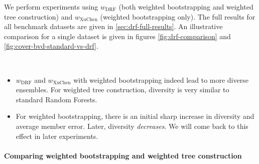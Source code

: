 \documentclass[../main.tex]{subfiles}
\begin{document}
We perform experiments using $w_\text{DRF}$ (both weighted bootstrapping and weighted tree construction) and $w_\text{XuChen}$ (weighted bootstrapping only). The full results for all benchmark datasets are given in \ref{sec:drf-full-results}. An illustrative comparison for a single dataset is given in figures \ref{fig:drf-comparison} and \ref{fig:cover-bvd-standard-vs-drf}.

\begin{observation} ~~
    \label{obs:drf}
    \begin{itemize}
        \item $w_\text{DRF}$ and $w_\text{XuChen}$ with weighted bootstrapping indeed lead to more diverse ensembles. For weighted tree construction, diversity is very similar to standard Random Forests.
        \item For weighted bootstrapping, there is an initial sharp increase in diversity and average member error. Later, diversity \textit{decreases}. We will come back to this effect in later experiments.
    \end{itemize}
\end{observation}




\paragraph{Comparing weighted bootstrapping and weighted tree construction} 
\end{document}

